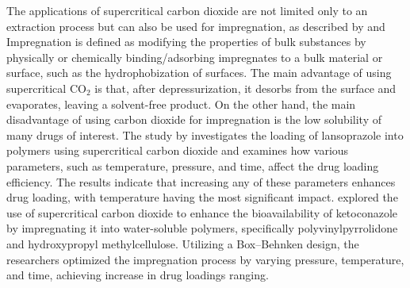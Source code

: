 \documentclass[a4paper,fleqn]{cas-dc}
\begin{document}
	The applications of supercritical carbon dioxide are not limited only to an extraction process but can also be used for impregnation, as described by \citet{Weidner2018} and \citet{Machado2022} Impregnation is defined as modifying the properties of bulk substances by physically or chemically binding/adsorbing impregnates to a bulk material or surface, such as the hydrophobization of surfaces. The main advantage of using supercritical CO$_2$ is that, after depressurization, it desorbs from the surface and evaporates, leaving a solvent-free product. On the other hand, the main disadvantage of using carbon dioxide for impregnation is the low solubility of many drugs of interest.
	The study by \citet{Ameri2020} investigates the loading of lansoprazole into polymers using supercritical carbon dioxide and examines how various parameters, such as temperature, pressure, and time, affect the drug loading efficiency. The results indicate that increasing any of these parameters enhances drug loading, with temperature having the most significant impact. \citet{Fathi2022} explored the use of supercritical carbon dioxide to enhance the bioavailability of ketoconazole by impregnating it into water-soluble polymers, specifically polyvinylpyrrolidone and hydroxypropyl methylcellulose. Utilizing a Box--Behnken design, the researchers optimized the impregnation process by varying pressure, temperature, and time, achieving increase in drug loadings ranging.
	
\end{document}
